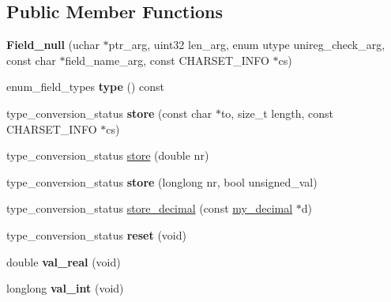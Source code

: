 \subsection*{Public Member Functions}
\begin{DoxyCompactItemize}
\item 
\mbox{\label{classField__null_af483a29d4d019980da48c145d0a29627}} 
{\bfseries Field\+\_\+null} (uchar $\ast$ptr\+\_\+arg, uint32 len\+\_\+arg, enum utype unireg\+\_\+check\+\_\+arg, const char $\ast$field\+\_\+name\+\_\+arg, const C\+H\+A\+R\+S\+E\+T\+\_\+\+I\+N\+FO $\ast$cs)
\item 
\mbox{\label{classField__null_a6d60f3a5824e3bc941efbd4176ad8947}} 
enum\+\_\+field\+\_\+types {\bfseries type} () const
\item 
\mbox{\label{classField__null_a685666ac77c127fb4dfb85fcb31e739c}} 
type\+\_\+conversion\+\_\+status {\bfseries store} (const char $\ast$to, size\+\_\+t length, const C\+H\+A\+R\+S\+E\+T\+\_\+\+I\+N\+FO $\ast$cs)
\item 
type\+\_\+conversion\+\_\+status \mbox{\hyperlink{classField__null_a396499b751f2dd051b816a3953943d2b}{store}} (double nr)
\item 
\mbox{\label{classField__null_a222d43e05518a70bbe74b11df519e532}} 
type\+\_\+conversion\+\_\+status {\bfseries store} (longlong nr, bool unsigned\+\_\+val)
\item 
type\+\_\+conversion\+\_\+status \mbox{\hyperlink{classField__null_a67a8c81f634b920257aff8736ad6e00e}{store\+\_\+decimal}} (const \mbox{\hyperlink{classmy__decimal}{my\+\_\+decimal}} $\ast$d)
\item 
\mbox{\label{classField__null_ac7efb430e48eb244fe4e219d7c953577}} 
type\+\_\+conversion\+\_\+status {\bfseries reset} (void)
\item 
\mbox{\label{classField__null_a98510f7e542679460b571640075a6e25}} 
double {\bfseries val\+\_\+real} (void)
\item 
\mbox{\label{classField__null_ad81e8d53a2a3917ff94a25942f1890c3}} 
longlong {\bfseries val\+\_\+int} (void)
\item 

\end{DoxyCompactItemize}
